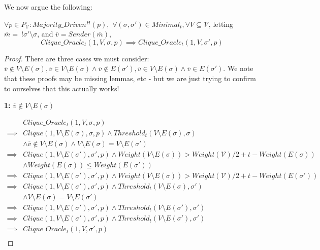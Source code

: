 We now argue the following:


\begin{lemma}
  $\forall p \in P_{\mathcal{C}} : Majority\_Driven^H(p),$ $\forall (\sigma, \sigma') \in Minimal_t, \forall V \subseteq \mathcal{V}$, letting $\overline{m} = ~ !\sigma'\setminus\sigma$, and $\overline{v} = Sender(\overline{m})$,
  $$
  Clique\_Oracle_t(1, V, \sigma, p) \implies Clique\_Oracle_t(1, V, \sigma', p)
  $$
\end{lemma}

\begin{proof}
  There are three cases we must consider: $\overline{v} \notin V \setminus E(\sigma), \overline{v} \in V \setminus E(\sigma) \land \overline{v} \notin E(\sigma'), \overline{v} \in V \setminus E(\sigma) \land \overline{v} \in E(\sigma')$. We note that these proofs may be missing lemmas, etc - but we are just trying to confirm to ourselves that this actually works!

  \textbf{1:} $\overline{v} \notin V \setminus E(\sigma)$

  \begin{align}
    &Clique\_Oracle_t(1, V, \sigma, p) \\
    \implies& Clique(1, V \setminus E(\sigma), \sigma, p) \land Threshold_t(V \setminus E(\sigma), \sigma) \\
            & \land \overline{v} \notin V \setminus E(\sigma) \land V \setminus E(\sigma) = V \setminus E(\sigma')\\
    \implies& Clique(1, V \setminus E(\sigma'), \sigma', p) \land Weight(V \setminus E(\sigma)) > Weight(\mathcal{V})/2 + t - Weight(E(\sigma)) \\
            & \land Weight(E(\sigma)) \leq Weight(E(\sigma')) \\
    \implies& Clique(1, V \setminus E(\sigma'), \sigma', p) \land Weight(V \setminus E(\sigma)) > Weight(\mathcal{V})/2 + t - Weight(E(\sigma')) \\
    \implies& Clique(1, V \setminus E(\sigma'), \sigma', p) \land Threshold_t(V \setminus E(\sigma), \sigma') \\
            & \land V \setminus E(\sigma) = V \setminus E(\sigma') \\
    \implies& Clique(1, V \setminus E(\sigma'), \sigma', p) \land Threshold_t(V \setminus E(\sigma'), \sigma') \\
    \implies& Clique(1, V \setminus E(\sigma'), \sigma', p) \land Threshold_t(V \setminus E(\sigma'), \sigma') \\
    \implies& Clique\_Oracle_t(1, V, \sigma', p) \\
  \end{align}



\end{proof}
